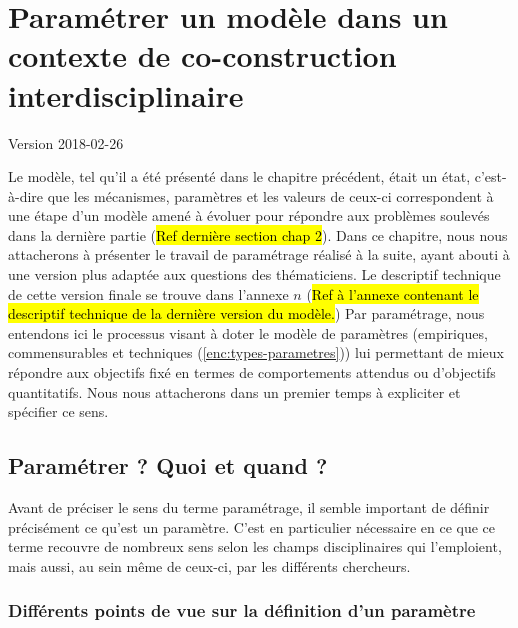 \documentclass[12pt, a4paper, oneside]{book}
\begin{document}
	\setcounter{part}{0}
	\setcounter{chapter}{2}
	\setcounter{secnumdepth}{6}
		
	\chapter{Paramétrer un modèle dans un contexte de co-construction interdisciplinaire}
	\begin{center}
		{\large Version 2018-02-26}
	\end{center}

	Le modèle, tel qu'il a été présenté dans le chapitre précédent, était un \og état\fg{}, c'est-à-dire que les mécanismes, paramètres et les valeurs de ceux-ci correspondent à une étape d'un modèle amené à évoluer pour répondre aux problèmes soulevés dans la dernière partie (\hl{Ref dernière section chap 2}).
	Dans ce chapitre, nous nous attacherons à présenter le travail de paramétrage réalisé à la suite, ayant abouti à une version plus adaptée aux questions des thématiciens. Le descriptif technique de cette version \og finale\fg{} se trouve dans l'annexe $n$ (\hl{Ref à l'annexe contenant le descriptif technique de la dernière version du modèle.})
	Par paramétrage, nous entendons ici le processus visant à doter le modèle de paramètres (empiriques, \og commensurables\fg{} et techniques (\cref{enc:types-parametres})) lui permettant de mieux répondre aux objectifs fixé en termes de comportements attendus ou d'objectifs quantitatifs. Nous nous attacherons dans un premier temps à expliciter et spécifier ce sens.
	
	\section{Paramétrer ? Quoi et quand ?}
	
	Avant de préciser le sens du terme \og paramétrage\fg{}, il semble important de définir précisément ce qu'est un paramètre. C'est en particulier nécessaire en ce que ce terme recouvre de nombreux sens selon les champs disciplinaires qui l'emploient, mais aussi, au sein même de ceux-ci, par les différents chercheurs.
	
	\subsection{Différents points de vue sur la définition d'un paramètre}
	
\end{document}
